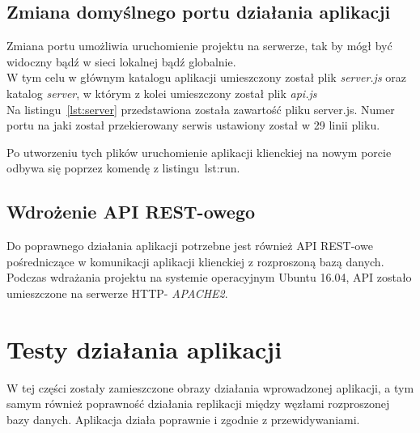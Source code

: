 \subsection{Zmiana domyślnego portu działania aplikacji}
Zmiana portu umożliwia uruchomienie projektu na serwerze, tak by mógł być widoczny bądź w sieci lokalnej bądź globalnie. \\

W tym celu w głównym katalogu aplikacji umieszczony został plik \textit{server.js} oraz katalog \textit{server}, w którym z kolei umieszczony został plik \textit{api.js}\\

Na listingu~\ref{lst:server} przedstawiona została zawartość pliku server.js. Numer portu na jaki został przekierowany serwis ustawiony został w 29 linii pliku.

\lssetdef


\lssetdef


Po utworzeniu tych plików uruchomienie aplikacji klienckiej na nowym porcie odbywa się poprzez komendę z listingu~{lst:run}.

\lssetdef


\subsection{Wdrożenie API REST-owego}
Do poprawnego działania aplikacji potrzebne jest również API REST-owe pośredniczące w komunikacji aplikacji klienckiej z rozproszoną bazą danych. Podczas wdrażania projektu na systemie operacyjnym Ubuntu 16.04, API zostało umieszczone na serwerze HTTP- \textit{APACHE2}.

\section{Testy działania aplikacji}

W tej części zostały zamieszczone obrazy działania wprowadzonej aplikacji, a tym samym również poprawność działania replikacji między węzłami rozproszonej bazy danych. Aplikacja działa poprawnie i zgodnie z przewidywaniami. \\

